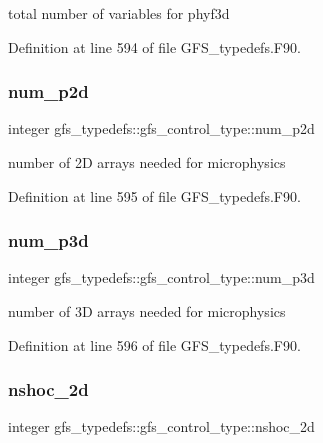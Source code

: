 total number of variables for phyf3d 



Definition at line 594 of file G\+F\+S\+\_\+typedefs.\+F90.

\mbox{\label{structgfs__typedefs_1_1gfs__control__type_a4f1908b2ffedb311c71892b232447bd4}} 
\subsubsection{num\+\_\+p2d}
{\footnotesize\ttfamily integer gfs\+\_\+typedefs\+::gfs\+\_\+control\+\_\+type\+::num\+\_\+p2d}



number of 2D arrays needed for microphysics 



Definition at line 595 of file G\+F\+S\+\_\+typedefs.\+F90.

\mbox{\label{structgfs__typedefs_1_1gfs__control__type_a442c04851021c33325171ca2615e2c0a}} 
\subsubsection{num\+\_\+p3d}
{\footnotesize\ttfamily integer gfs\+\_\+typedefs\+::gfs\+\_\+control\+\_\+type\+::num\+\_\+p3d}



number of 3D arrays needed for microphysics 



Definition at line 596 of file G\+F\+S\+\_\+typedefs.\+F90.

\mbox{\label{structgfs__typedefs_1_1gfs__control__type_a0021e6548cad93314da3e957bc0c8db3}} 
\subsubsection{nshoc\+\_\+2d}
{\footnotesize\ttfamily integer gfs\+\_\+typedefs\+::gfs\+\_\+control\+\_\+type\+::nshoc\+\_\+2d}



